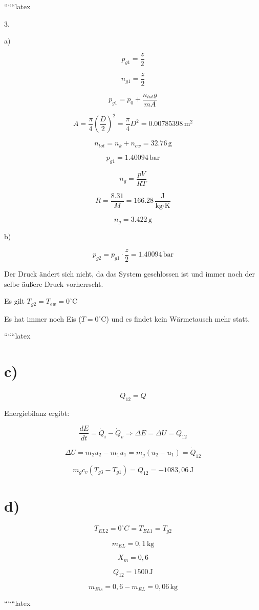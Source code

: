 
``````latex


3.

a)

\[
p_{g1} = \frac{z}{2}
\]

\[
n_{g1} = \frac{z}{2}
\]

\[
p_{g1} = p_0 + \frac{n_{tot} g}{m A}
\]

\[
A = \frac{\pi}{4} \left( \frac{D}{2} \right)^2 = \frac{\pi}{4} D^2 = 0.00785398 \, \text{m}^2
\]

\[
n_{tot} = n_{k} + n_{cw} = 32.76 \, \text{g}
\]

\[
p_{g1} = 1.40094 \, \text{bar}
\]

\[
n_{g} = \frac{p V}{R T}
\]

\[
R = \frac{8.31}{M} = 166.28 \, \frac{\text{J}}{\text{kg} \cdot \text{K}}
\]

\[
n_{g} = 3.422 \, \text{g}
\]

b)

\[
p_{g2} = p_{g1} \cdot \frac{z}{2} = 1.40094 \, \text{bar}
\]

Der Druck ändert sich nicht, da das System geschlossen ist und immer noch der selbe äußere Druck vorherrscht.

Es gilt \( T_{g2} = T_{ew} = 0^\circ \text{C} \)

Es hat immer noch Eis (\(T = 0^\circ \text{C}\)) und es findet kein Wärmetausch mehr statt.

``````latex


\section*{c)}

\[
Q_{12} = \dot{Q}
\]

Energiebilanz ergibt:

\[
\frac{dE}{dt} = \dot{Q}_i - \dot{Q}_v \Rightarrow \Delta E = \Delta U = Q_{12}
\]

\[
\Delta U = m_2 u_2 - m_1 u_1 = m_g (u_2 - u_1) = \dot{Q}_{12}
\]

\[
m_g c_v (T_{g3} - T_{g1}) = Q_{12} = -1083,06 \, \text{J}
\]

\section*{d)}

\[
T_{EL2} = 0^\circ C = T_{EL1} = T_{g2}
\]

\[
m_{EL} = 0,1 \, \text{kg}
\]

\[
X_m = 0,6
\]

\[
Q_{12} = 1500 \, \text{J}
\]

\[
m_{Eis} = 0,6 - m_{EL} = 0,06 \, \text{kg}
\]

``````latex


